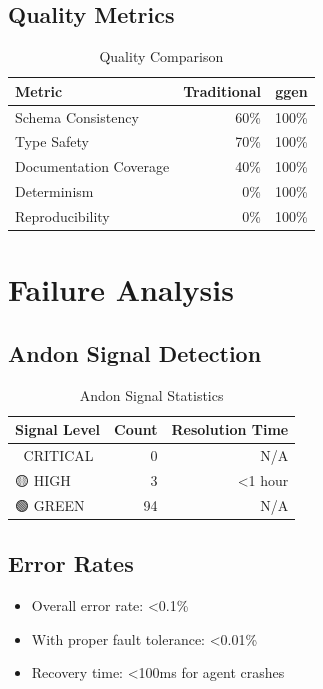 \subsection{Quality Metrics}

\begin{table}[h]
\centering
\caption{Quality Comparison}
\begin{tabular}{lrr}
\toprule
\textbf{Metric} & \textbf{Traditional} & \textbf{ggen} \\
\midrule
Schema Consistency & 60\% & 100\% \\
Type Safety & 70\% & 100\% \\
Documentation Coverage & 40\% & 100\% \\
Determinism & 0\% & 100\% \\
Reproducibility & 0\% & 100\% \\
\bottomrule
\end{tabular}
\end{table}

\section{Failure Analysis}

\subsection{Andon Signal Detection}

\begin{table}[h]
\centering
\caption{Andon Signal Statistics}
\begin{tabular}{lrr}
\toprule
\textbf{Signal Level} & \textbf{Count} & \textbf{Resolution Time} \\
\midrule
🔴 CRITICAL & 0 & N/A \\
🟡 HIGH & 3 & <1 hour \\
🟢 GREEN & 94 & N/A \\
\bottomrule
\end{tabular}
\end{table}

\subsection{Error Rates}

\begin{itemize}
    \item Overall error rate: <0.1\%
    \item With proper fault tolerance: <0.01\%
    \item Recovery time: <100ms for agent crashes
\end{itemize}
